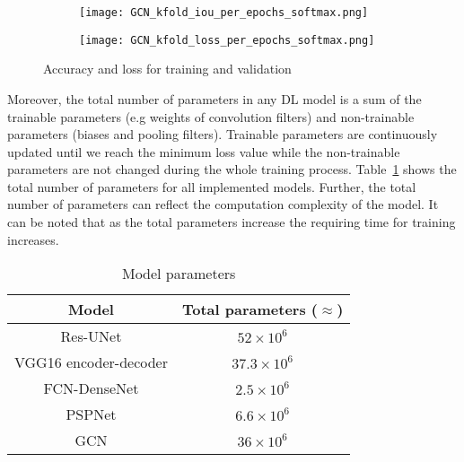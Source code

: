 \begin{figure} [!h]
	\hfill
	\begin{subfigure}[b]{0.47\textwidth}
		\centering
		\texttt{[image: GCN\_kfold\_iou\_per\_epochs\_softmax.png]}
		\caption{}
		\label{fig:gcn_accuracy_metric}
	\end{subfigure}
	\hfill
	\begin{subfigure}[b]{0.47\textwidth}
		\centering
		\texttt{[image: GCN\_kfold\_loss\_per\_epochs\_softmax.png]}
		\caption{}
		\label{fig:gcn_loss_metric}
	\end{subfigure}
	\caption{Accuracy and loss for training and validation}
	\label{fig:accuracy_metric}
\end{figure} 
Moreover, the total number of parameters in any DL model is a sum of the trainable parameters (e.g weights of convolution filters) and non-trainable parameters (biases and pooling filters).
Trainable parameters are continuously updated until we reach the minimum loss value while the non-trainable parameters are not changed during the whole training process.
Table~\ref{tab:table_parameters} shows the total number of parameters for all implemented models.
Further, the total number of parameters can reflect the computation complexity of the model.
It can be noted that as the total parameters increase the requiring time for training increases.

\begin{table}[]
	\centering
	\caption{Model parameters}
	\label{tab:table_parameters}
		\begin{tabular}{cc}\hline
			Model &  Total parameters (\(\approx\)) \\ \hline
			Res-UNet & \(52\times 10^6\) \\ 
			VGG16 encoder-decoder & \(37.3\times 10^6\)  \\
			FCN-DenseNet & \(2.5\times 10^6\) \\ 
			PSPNet & \(6.6\times 10^6\) \\ 
			GCN & \(36\times 10^6\) \\ \hline
		\end{tabular}
\end{table}

